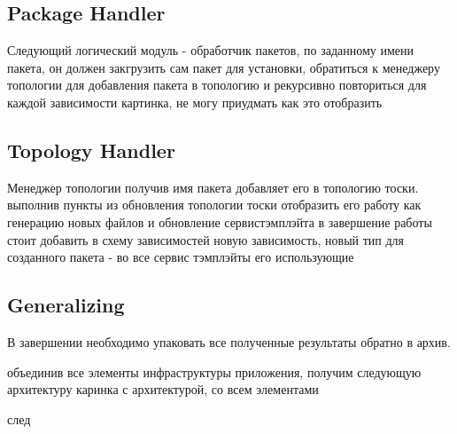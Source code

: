 \fi
\subsection*{Package Handler}
Следующий логический модуль - обработчик пакетов, по заданному имени пакета, он должен закгрузить сам пакет для установки, обратиться к менеджеру топологии для добавления пакета в топологию и рекурсивно повториться для каждой зависимости
картинка, не могу приудмать как это отобразить


\fi
\subsection*{Topology Handler}
Менеджер топологии получив имя пакета добавляет его в топологию тоски. выполнив пункты из обновления топологии тоски
отобразить его работу как генерацию новых файлов и обновление сервистэмплэйта
в завершение работы стоит добавить в схему зависимостей новую зависимость, новый тип для созданного пакета - во все сервис тэмплэйты его использующие


\fi
\subsection*{Generalizing}
В завершении необходимо упаковать все полученные результаты обратно в архив.

объединив все элементы инфраструктуры приложения,  получим следующую архитектуру
каринка с архитектурой, со всем элементами

след



\fi
